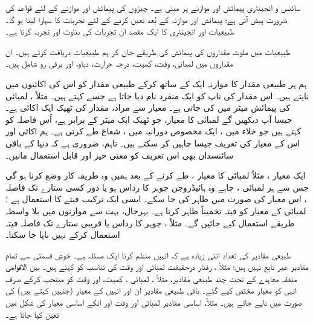 
سائنس و  انجینئری پیمائش اور موازنے  پر مبنی ہے۔ چیزوں کی پیمائش اور موازنے کے  لئے قواعد کی ضرورت پیش آتی ہے؛  پیمائش اور موازنہ کے  بُعد تعین کرنے کے لئے تجربات کا سہارا لینا  ہو گا۔ طبیعیات اور انجینئری کا ایک مقصد ان تجربات کی بناوٹ اور تجربہ کرنا ہے۔

طبیعیات میں ملوث مقداروں کی پیمائش کی طریقے جان کر ہم طبیعیات دریافت کرتے ہیں۔ ان مقداروں میں لمبائی، وقت، کمیت، درجہ حرارت، دباو، اور برقی رو شامل ہیں۔

ہم ہر طبیعی  مقدار کا موازنہ ایک   کے ساتھ کرکے  طبیعی مقدار  کو اس کی اکائیوں  میں ناپتے ہیں۔ اس مقدار کی ناپ کو ایک منفرد نام دیا جاتا ہے جسے   کہتے ہیں۔ مثلاً ، لمبائی کی پیمائش   میٹر  میں  کی جاتی ہے۔ معیار سے مراد،  مقدار کی ٹھیک ایک اکائی ہے۔ جیسا آپ دیکھیں گے لمبائی کا معیار،  جو ٹھیک ایک میٹر کے برابر ہے، اُس فاصلہ کو کہتے ہیں جو خلاء میں  ،  ایک مخصوص دورانیہ میں  ، شعاع طے کرتی  ہے۔ ہم اکائی اور اس کے معیار کی تعریف جیسا چاہیں کر سکتے ہیں۔ تاہم، ضروری ہے کہ دنیا کے باقی سائنسدان بھی اس تعریف کو معنی خیز اور قابل استعمال  مانیں۔

ایک معیار ، مثلاً لمبائی کا معیار ،  طے کرنے کے بعد ہمیں وہ طریقہ کار وضع  کرنا  ہو گی جس سے   ہر  لمبائی ، چاہے وہ ہائیڈروجن جوہر کا رداس ہو یا دور  کسی ستارے تک فاصلہ ، اس معیار کی صورت میں ظاہر کی جا سکے۔ ایسی ایک ترکیب فیتے کا استعمال ہے ؛  لمبائی کے معیار کو  فیتہ تخمیناً ظاہر کرتا ہے۔ بہرحال، بہت سے  موازنوں میں بلا واسطہ طریقے استعمال کیے  جائیں گے۔ مثلاً ،  جوہر کا رداس یا قریبی ستارے تک فاصلہ فیتہ استعمال کرکے نہیں ناپا جا سکتا۔

 طبیعی مقادیر کی تعداد اتنی زیادہ ہے  کہ انہیں منظم کرنا  ایک  مسئلہ ہے۔  خوش قسمتی سے تمام  مقادیر غیر تابع نہیں ہیں؛ مثلاً ، رفتار درحقیقت لمبائی اور وقت کی  تناسب کو کہتے ہیں۔  بین الاقوامی متفقہ  معاہدے کے تحت چند طبیعی مقادیر،  مثلاً ،  لمبائی ،  کمیت، اور وقت  کو منتخب کرکے صرف انہی کو معیار مختص کیے گئے۔   باقی  طبیعی مقادیر ان  اور  انہیں کے  معیار (جنہیں   کہتے ہیں) کی صورت میں ناپے جاتے ہیں۔ مثلاً،  اساسی مقادیر  لمبائی اور وقت اور انکے اساسی معیار کی  شکل میں  تعین کیا جاتا ہے۔ 

